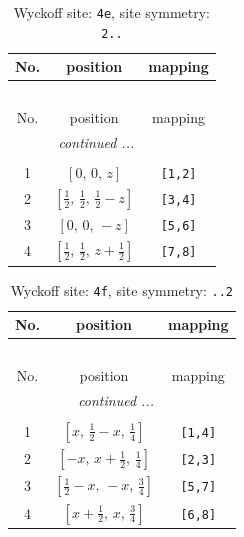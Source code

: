 \documentclass[fleqn,8pt]{jsarticle}
\begin{document}
\begin{longtable}{ccc}
\caption{Wyckoff site: {\tt 4e}, site symmetry: {\tt 2..}}
 \\
 \hline \hline
No. & position & mapping \\ \hline \endfirsthead

\multicolumn{2}{l}{\tablename\ \thetable{}} \\
 \hline \hline
No. & position & mapping \\ \hline \endhead

 \hline \hline
\multicolumn{2}{r}{\footnotesize\it continued ...} \\ \endfoot

 \hline \hline
\multicolumn{2}{r}{} \\ \endlastfoot

1 & $\left[ 0,\, 0,\, z \right]$ & {\tt [1,2]} \\ \hline
2 & $\left[ \frac{1}{2},\, \frac{1}{2},\, \frac{1}{2} - z \right]$ & {\tt [3,4]} \\ \hline
3 & $\left[ 0,\, 0,\, - z \right]$ & {\tt [5,6]} \\ \hline
4 & $\left[ \frac{1}{2},\, \frac{1}{2},\, z + \frac{1}{2} \right]$ & {\tt [7,8]} \\
\end{longtable}
\renewcommand{\arraystretch}{1.2}
\begin{longtable}{ccc}
\caption{Wyckoff site: {\tt 4f}, site symmetry: {\tt ..2}}
 \\
 \hline \hline
No. & position & mapping \\ \hline \endfirsthead

\multicolumn{2}{l}{\tablename\ \thetable{}} \\
 \hline \hline
No. & position & mapping \\ \hline \endhead

 \hline \hline
\multicolumn{2}{r}{\footnotesize\it continued ...} \\ \endfoot

 \hline \hline
\multicolumn{2}{r}{} \\ \endlastfoot

1 & $\left[ x,\, \frac{1}{2} - x,\, \frac{1}{4} \right]$ & {\tt [1,4]} \\ \hline
2 & $\left[ - x,\, x + \frac{1}{2},\, \frac{1}{4} \right]$ & {\tt [2,3]} \\ \hline
3 & $\left[ \frac{1}{2} - x,\, - x,\, \frac{3}{4} \right]$ & {\tt [5,7]} \\ \hline
4 & $\left[ x + \frac{1}{2},\, x,\, \frac{3}{4} \right]$ & {\tt [6,8]} \\
\end{longtable}
\end{document}
